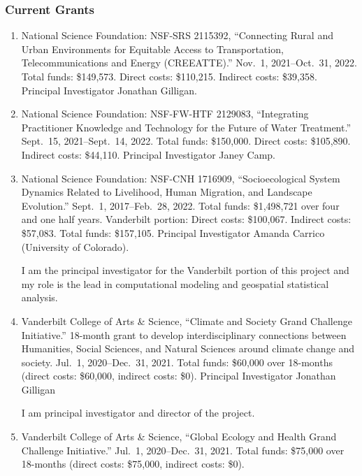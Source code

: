 %
%
\subsubsection{Current Grants}
\begin{enumerate}
	\item National Science Foundation: NSF-SRS 2115392,
	``Connecting Rural and Urban Environments for Equitable Access to Transportation, Telecommunications and Energy (CREEATTE).''
	Nov.~1, 2021--Oct.~31, 2022.
	Total funds: \$149,573. Direct costs: \$110,215. Indirect costs: \$39,358.
	Principal Investigator Jonathan Gilligan.
	\item National Science Foundation: NSF-FW-HTF 2129083,
	``Integrating Practitioner Knowledge and Technology for the Future of Water Treatment.''
	Sept.~15, 2021--Sept.~14, 2022. 
	Total funds: \$150,000. Direct costs: \$105,890. Indirect costs: \$44,110.
	Principal Investigator Janey Camp.
    \item National Science Foundation: NSF-CNH 1716909,
    ``Socioecological System Dynamics Related to Livelihood, Human Migration, and Landscape Evolution.''
    Sept.~1, 2017--Feb.~28, 2022.
    Total funds: \$1,498,721 over four and one half years. Vanderbilt portion: Direct costs: \$100,067. Indirect costs: \$57,083. Total funds: \$157,105.
    Principal Investigator Amanda Carrico (University of Colorado).
\begin{credit}
I am the principal investigator for the Vanderbilt portion of this project and my role is the lead in computational modeling and geospatial statistical analysis.
\end{credit}
    \item Vanderbilt College of Arts \& Science,
    ``Climate and Society Grand Challenge Initiative.''
    18-month grant to develop interdisciplinary connections between Humanities, Social Sciences, and Natural Sciences around climate change and society.
    Jul.~1, 2020--Dec.~31, 2021.
    Total funds: \$60,000 over 18-months (direct costs: \$60,000, indirect costs: \$0).
    Principal Investigator Jonathan Gilligan
\begin{credit}
I am principal investigator and director of the project.
\end{credit}
    \item Vanderbilt College of Arts \& Science,
    ``Global Ecology and Health Grand Challenge Initiative.''
    Jul.~1, 2020--Dec.~31, 2021.
    Total funds: \$75,000 over 18-months (direct costs: \$75,000, indirect costs: \$0).

\end{enumerate}
